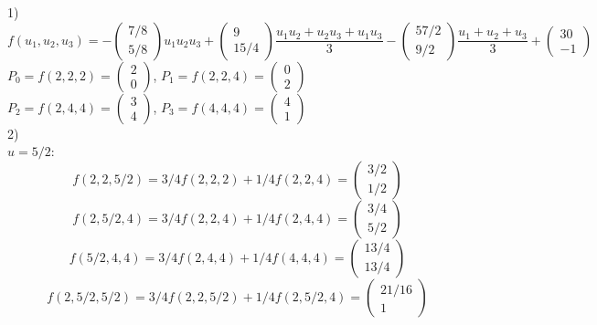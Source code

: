 \documentclass{article}
\begin{document}
	1)	
	\begin{equation*}
		f(u_1,u_2,u_3)=-\left(\begin{array}{c} 7/8\\5/8 \end{array}\right)u_1u_2u_3+
		\left(\begin{array}{c} 9\\15/4 \end{array}\right)\frac{u_1u_2+u_2u_3+u_1u_3}{3}-
		\left(\begin{array}{c} 57/2\\9/2 \end{array}\right)\frac{u_1+u_2+u_3}{3}+
		\left(\begin{array}{c} 30\\-1 \end{array}\right)
	\end{equation*}
	$P_0=f(2,2,2)=\left(\begin{array}{c} 2\\0 \end{array}\right)$,
	$P_1=f(2,2,4)=\left(\begin{array}{c} 0\\2 \end{array}\right)$\\
	$P_2=f(2,4,4)=\left(\begin{array}{c} 3\\4 \end{array}\right)$,
	$P_3=f(4,4,4)=\left(\begin{array}{c} 4\\1 \end{array}\right)$\\
	2)\\
	$u=5/2$:\\
	$$f(2,2,5/2)=3/4f(2,2,2)+1/4f(2,2,4)=\left(\begin{array}{c} 3/2\\1/2 \end{array}\right)$$
	$$f(2,5/2,4)=3/4f(2,2,4)+1/4f(2,4,4)=\left(\begin{array}{c} 3/4\\5/2 \end{array}\right)$$
	$$f(5/2,4,4)=3/4f(2,4,4)+1/4f(4,4,4)=\left(\begin{array}{c} 13/4\\13/4 \end{array}\right)$$
	$$f(2,5/2,5/2)=3/4f(2,2,5/2)+1/4f(2,5/2,4)=\left(\begin{array}{c} 21/16\\1 \end{array}\right)$$
\end{document}

